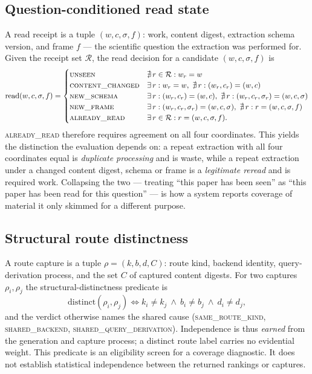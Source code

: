 \subsection{Question-conditioned read state}

A read receipt is a tuple $(w, c, \sigma, f)$: work, content digest, extraction
schema version, and frame $f$ --- the scientific question the extraction was
performed for. Given the receipt set $\mathcal{R}$, the read decision for a
candidate $(w, c, \sigma, f)$ is
\[
\mathrm{read}(w,c,\sigma,f) =
\begin{cases}
\textsc{unseen} & \nexists\, r \in \mathcal{R}: w_r = w\\
\textsc{content\_changed} & \exists\, r: w_r=w,\ \nexists\, r: (w_r,c_r)=(w,c)\\
\textsc{new\_schema} & \exists\, r: (w_r,c_r)=(w,c),\ \nexists\, r: (w_r,c_r,\sigma_r)=(w,c,\sigma)\\
\textsc{new\_frame} & \exists\, r: (w_r,c_r,\sigma_r)=(w,c,\sigma),\ \nexists\, r: r=(w,c,\sigma,f)\\
\textsc{already\_read} & \exists\, r \in \mathcal{R}: r = (w,c,\sigma,f).
\end{cases}
\]
\textsc{already\_read} therefore requires agreement on all four coordinates.
This yields the distinction the evaluation depends on: a repeat extraction with
all four coordinates equal is \emph{duplicate processing} and is waste, while a
repeat extraction under a changed content digest, schema or frame is a
\emph{legitimate reread} and is required work. Collapsing the two --- treating
``this paper has been seen'' as ``this paper has been read for this question''
--- is how a system reports coverage of material it only skimmed for a different
purpose.

\subsection{Structural route distinctness}

A route capture is a tuple $\rho = (k, b, d, C)$: route kind, backend identity,
query-derivation process, and the set $C$ of captured content digests. For two
captures $\rho_i, \rho_j$ the structural-distinctness predicate is
\[
\mathrm{distinct}(\rho_i,\rho_j) \iff k_i \neq k_j \ \wedge\ b_i \neq b_j \ \wedge\ d_i \neq d_j ,
\]
and the verdict otherwise names the shared cause
(\textsc{same\_route\_kind}, \textsc{shared\_backend},
\textsc{shared\_query\_derivation}). Independence is thus \emph{earned} from the
generation and capture process; a distinct route label carries no evidential
weight. This predicate is an eligibility screen for a coverage diagnostic. It
does not establish statistical independence between the returned rankings or
captures.

